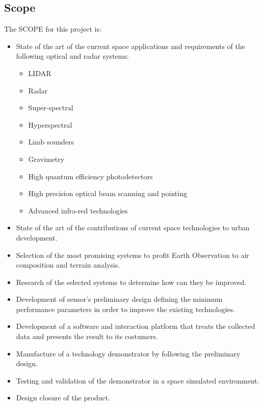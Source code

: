 \subsection{Scope}


The SCOPE for this project is:

\begin{itemize}

	\item State of the art of the current space applications and requirements of the following optical and radar systems:

		\begin{itemize}

		\item LIDAR
		\item Radar
		\item Super-spectral
		\item Hyperspectral
		\item Limb sounders
		\item Gravimetry
		\item High quantum efficiency photodetectors
		\item High precision optical beam scanning and pointing
		\item Advanced infra-red technologies

		\end{itemize}

	\item State of the art of the contributions of current space technologies to urban development.

	\item Selection of the most promising systems to profit Earth Observation to air composition and terrain analysis.
	
	\item Research of the selected systems to determine how can they be improved. 
	
	\item Development of sensor's preliminary design defining the minimum performance parameters in order to improve the existing technologies.

	\item Development of a software and interaction platform that treats the collected data and presents the result to its costumers. 

	\item Manufacture of a technology demonstrator by following the preliminary design.

	\item Testing and validation of the demonstrator in a space simulated environment.

	\item Design closure of the product.

\end{itemize}

